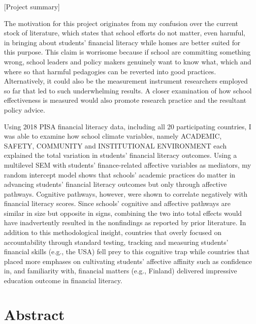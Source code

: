 \documentclass[a4paper,11pt,UKenglish,twoside,openright]{report}\usepackage[]{graphicx}\usepackage[]{color}
\begin{document}
[Project summary]

The motivation for this project originates from my confusion over the current stock of literature, which states that school efforts do not matter, even harmful, in bringing about students' financial literacy while homes are better suited for this purpose. This claim is worrisome because if school are committing something wrong, school leaders and policy makers genuinely want to know what, which and where so that harmful pedagogies can be reverted into good practices. Alternatively, it could also be the measurement instrument researchers employed so far that led to such underwhelming results. A closer examination of how school effectiveness is measured would also promote research practice and the resultant policy advice.

Using 2018 PISA financial literacy data, including all 20 participating countries, I was able to examine how school climate variables, namely ACADEMIC, SAFETY, COMMUNITY and INSTITUTIONAL ENVIRONMENT each explained the total variation in students' financial literacy outcomes. Using a multilevel SEM with students' finance-related affective variables as mediators, my random intercept model shows that schools' academic practices do matter in advancing students' financial literacy outcomes but only through affective pathways. Cognitive pathways, however, were shown to correlate negatively with financial literacy scores. Since schools' cognitive and affective pathways are similar in size but opposite in signs, combining the two into total effects would have inadvertently resulted in the nonfindings as reported by prior literature. In addition to this methodological insight, countries that overly focused on accountability through standard testing, tracking and measuring students' financial skills (e.g., the USA) fell prey to this cognitive trap while countries that placed more emphases on cultivating students' affective affinity such as confidence in, and familiarity with, financial matters (e.g., Finland) delivered impressive education outcome in financial literacy.


\chapter*{Abstract}
\label{Ab.1}
\end{document}
